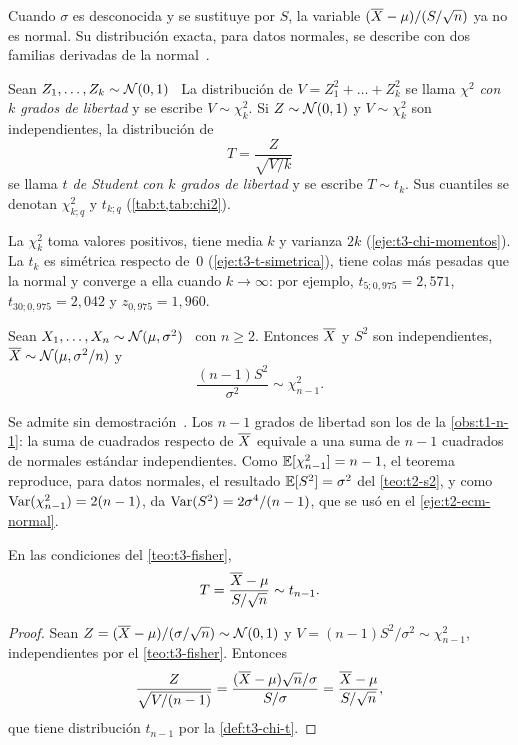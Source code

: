 Cuando $\sigma$ es desconocida y se sustituye por $S$, la variable $(\overline{X}-\mu)/(S/\sqrt n)$ ya no es normal. Su distribución exacta, para datos normales, se describe con dos familias derivadas de la normal~\cite[§10.4]{bh}.

\begin{definicion}\label{def:t3-chi-t}
Sean $Z_1,\dots,Z_k\sim\mathcal{N}(0,1)$ \iid\ La distribución de $V=Z_1^{2}+\dots+Z_k^{2}$ se llama \emph{$\chi^{2}$ con $k$ grados de libertad} y se escribe $V\sim\chi^{2}_k$. Si $Z\sim\mathcal{N}(0,1)$ y $V\sim\chi^{2}_k$ son independientes, la distribución de
\[
T=\frac{Z}{\sqrt{V/k}}
\]
se llama \emph{$t$ de Student con $k$ grados de libertad} y se escribe $T\sim t_k$. Sus cuantiles se denotan $\chi^{2}_{k;q}$ y $t_{k;q}$ (\cref{tab:t,tab:chi2}).
\end{definicion}

La $\chi^{2}_k$ toma valores positivos, tiene media $k$ y varianza $2k$ (\cref{eje:t3-chi-momentos}). La $t_k$ es simétrica respecto de~$0$ (\cref{eje:t3-t-simetrica}), tiene colas más pesadas que la normal y converge a ella cuando $k\to\infty$: por ejemplo, $t_{5;0{,}975}=2{,}571$, $t_{30;0{,}975}=2{,}042$ y $z_{0{,}975}=1{,}960$.

\begin{teorema}\label{teo:t3-fisher}
Sean $X_1,\dots,X_n\sim\mathcal{N}(\mu,\sigma^{2})$ \iid\ con $n\ge2$. Entonces $\overline{X}$ y $S^{2}$ son independientes, $\overline{X}\sim\mathcal{N}(\mu,\sigma^{2}/n)$ y
\[
\frac{(n-1)S^{2}}{\sigma^{2}}\sim\chi^{2}_{n-1}.
\]
\end{teorema}

Se admite sin demostración~\cite[§10.4]{bh}. Los $n-1$ grados de libertad son los de la \cref{obs:t1-n-1}: la suma de cuadrados respecto de $\overline{X}$ equivale a una suma de $n-1$ cuadrados de normales estándar independientes. Como $\mathbb{E}[\chi^{2}_{n-1}]=n-1$, el teorema reproduce, para datos normales, el resultado $\mathbb{E}[S^{2}]=\sigma^{2}$ del \cref{teo:t2-s2}, y como $\operatorname{Var}(\chi^{2}_{n-1})=2(n-1)$, da $\operatorname{Var}(S^{2})=2\sigma^{4}/(n-1)$, que se usó en el \cref{eje:t2-ecm-normal}.

\begin{corolario}[Estadístico $t$]\label{cor:t3-t}
En las condiciones del \cref{teo:t3-fisher},
\[
T=\frac{\overline{X}-\mu}{S/\sqrt n}\sim t_{n-1}.
\]
\end{corolario}

\begin{proof}
Sean $Z=(\overline{X}-\mu)/(\sigma/\sqrt n)\sim\mathcal{N}(0,1)$ y $V=(n-1)S^{2}/\sigma^{2}\sim\chi^{2}_{n-1}$, independientes por el \cref{teo:t3-fisher}. Entonces
\[
\frac{Z}{\sqrt{V/(n-1)}}=\frac{(\overline{X}-\mu)\sqrt n/\sigma}{S/\sigma}=\frac{\overline{X}-\mu}{S/\sqrt n},
\]
que tiene distribución $t_{n-1}$ por la \cref{def:t3-chi-t}.
\end{proof}

